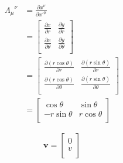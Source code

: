 \documentclass[12pt]{article}
\begin{document}
\begin{equation*}
      \begin{split}
            {\Lambda_\mu}^\nu
             & = \frac{\partial x^\nu}{\partial {x'}^\mu}                                                   \\
             & =
            \begin{bmatrix}
                  \frac{\partial x}{\partial r}      & \frac{\partial y}{\partial r}      \\
                  \frac{\partial x}{\partial \theta} & \frac{\partial y}{\partial \theta} \\
            \end{bmatrix}                         \\
             & =
            \begin{bmatrix}
                  \frac{\partial (r \cos{\theta}) }{\partial r}      & \frac{\partial (r \sin{\theta}) }{\partial r}      \\
                  \frac{\partial (r \cos{\theta}) }{\partial \theta} & \frac{\partial (r \sin{\theta}) }{\partial \theta} \\
            \end{bmatrix} \\
             & =
            \begin{bmatrix}
                  \cos{\theta}     & \sin{\theta}   \\
                  - r \sin{\theta} & r \cos{\theta} \\
            \end{bmatrix}
      \end{split}
\end{equation*}

\[
      \mathbf{v} =
      \begin{bmatrix}
            0 \\
            v \\
      \end{bmatrix}
\]
\end{document}
